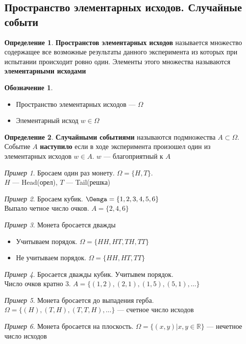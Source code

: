 \documentclass[oneside]{book}
\newcommand{\R}{\mathbb{R}}
\theoremstyle{plain}
\theoremstyle{remark}
\newtheorem*{examp}{Пример}
\theoremstyle{definition}
\newtheorem*{definition}{Определение}
\newtheorem*{symb}{Обозначение}
\begin{document}
\subsection{Пространство элементарных исходов. Случайные событи}
\label{sec:org5d41f15}
\begin{definition}
\textbf{Пространстов элементарных исходов} называется множество
содержащее все возможные результаты данного эксперимента из которых при
испытании происходит ровно один. Элементы этого множества называются \textbf{элементарными исходами}
\end{definition}
\begin{symb}
\-
\begin{itemize}
\item Пространство элементарных исходов --- \(\Omega\)
\item Элементарный исход \(w \in \Omega\)
\end{itemize}
\end{symb}
\begin{definition}
\textbf{Случайными событиями} называются подмножества \(A \subset \Omega\). Событие \(A\) \textbf{наступило} если в ходе эксперимента
произошел один из элементарных исходов \(w \in A\). \(w\) --- благоприятный к \(A\)
\end{definition}
\begin{examp}
Бросаем один раз монету. \(\Omega = \{H, T\}\). \\
\color{gray}
\(H\) --- Head(орел), \(T\) --- Tail(решка)
\end{examp}
\begin{examp}
Бросаем кубик. \(\Oemga = \{1, 2, 3, 4, 5, 6\}\) \\
Выпало четное число очков. \(A = \{2, 4, 6\}\)
\end{examp}
\begin{examp}
Монета бросается дважды
\begin{itemize}
\item Учитываем порядок. \(\Omega = \{HH, HT, TH, TT\}\)
\item Не учитываем порядок. \(\Omega = \{HH, HT, TT\}\)
\end{itemize}
\end{examp}
\begin{examp}
Бросается дважды кубик. Учитывем порядок. \\
Число очков кратно \(3\). \(A = \{ (1, 2), (2, 1), (1, 5), (5, 1), \dots \}\) 
\end{examp}
\begin{examp}
Монета бросается до выпадения герба. \(\Omega = \{ (H), (T, H), (T, T, H), \dots \}\) --- счетное число исходов
\end{examp}
\begin{examp}
Монета бросается на плоскость. \(\Omega = \{(x, y) \big\vert x, y \in \R\}\) --- нечетное число исходов
\end{examp}
\end{document}
